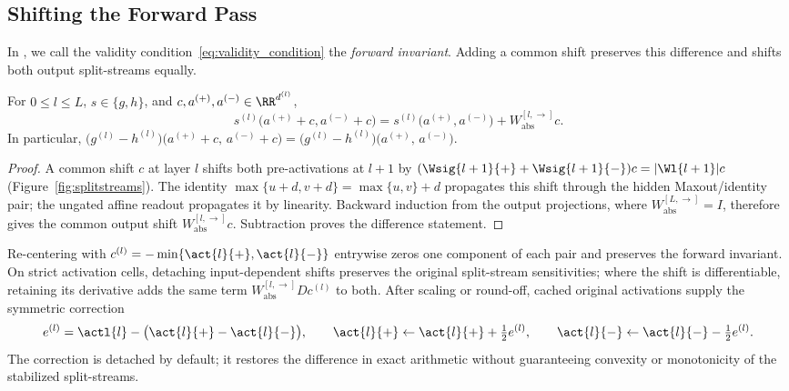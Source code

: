 \subsection{Shifting the Forward Pass}\label{subsec:forward_stabilization}

In \textcite{hiddenMono}, we call the validity condition~\eqref{eq:validity_condition} the \emph{forward invariant}. Adding a common shift preserves this difference and shifts both output split-streams equally.

\begin{theoremenv}\label{thm:shift_forward}
For $0\le l\le L$, $s\in\{g,h\}$, and $c,a^{(+)},a^{(-)}\in\RR^{d^{(l)}}$,
\begin{equation}
s^{(l)}\bigl(a^{(+)}+c,a^{(-)}+c\bigr)
=s^{(l)}\bigl(a^{(+)},a^{(-)}\bigr)+W_{\mathrm{abs}}^{[l,\rightarrow]}c.
\label{eq:shift_forward}
\end{equation}
In particular, $\bigl(g^{(l)} - h^{(l)}\bigr)\bigl( a^{(+)} + c,\, a^{(-)} + c \bigr) = \bigl(g^{(l)} - h^{(l)}\bigr)\bigl( a^{(+)},\, a^{(-)} \bigr)$.\end{theoremenv}

\begin{proof}
A common shift $c$ at layer $l$ shifts both pre-activations at $l+1$ by $(\Wsig{l+1}{+}+\Wsig{l+1}{-})c=|\Wl{l+1}|c$ (Figure~\ref{fig:splitstreams}). The identity $\max\{u+d,v+d\}=\max\{u,v\}+d$ propagates this shift through the hidden Maxout/identity pair; the ungated affine readout propagates it by linearity. Backward induction from the output projections, where $W_{\mathrm{abs}}^{[L,\rightarrow]}=I$, therefore gives the common output shift $W_{\mathrm{abs}}^{[l,\rightarrow]}c$. Subtraction proves the difference statement.
\end{proof}

Re-centering with $c^{(l)}=-\min\{\act{l}{+},\act{l}{-}\}$ entrywise zeros one component of each pair and preserves the forward invariant. On strict activation cells, detaching input-dependent shifts preserves the original split-stream sensitivities; where the shift is differentiable, retaining its derivative adds the same term $W_{\mathrm{abs}}^{[l,\rightarrow]}Dc^{(l)}$ to both. After scaling or round-off, cached original activations supply the symmetric correction
\[
    e^{(l)}=\actl{l}-\bigl(\act{l}{+}-\act{l}{-}\bigr),
    \qquad
    \act{l}{+}\leftarrow\act{l}{+}+\tfrac12 e^{(l)},
    \qquad
    \act{l}{-}\leftarrow\act{l}{-}-\tfrac12 e^{(l)}.
\]
The correction is detached by default; it restores the difference in exact arithmetic without guaranteeing convexity or monotonicity of the stabilized split-streams.

